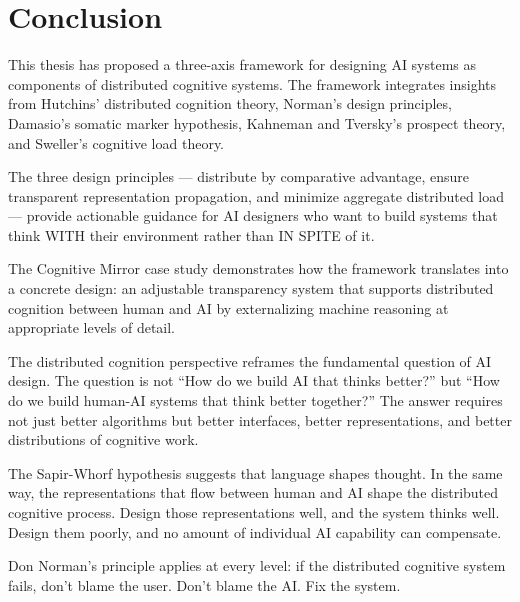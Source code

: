 \documentclass[11pt,a4paper]{article}
\begin{document}
\section{Conclusion}

This thesis has proposed a three-axis framework for designing AI systems as components of distributed cognitive systems. The framework integrates insights from Hutchins' distributed cognition theory, Norman's design principles, Damasio's somatic marker hypothesis, Kahneman and Tversky's prospect theory, and Sweller's cognitive load theory.

The three design principles --- distribute by comparative advantage, ensure transparent representation propagation, and minimize aggregate distributed load --- provide actionable guidance for AI designers who want to build systems that think WITH their environment rather than IN SPITE of it.

The Cognitive Mirror case study demonstrates how the framework translates into a concrete design: an adjustable transparency system that supports distributed cognition between human and AI by externalizing machine reasoning at appropriate levels of detail.

The distributed cognition perspective reframes the fundamental question of AI design. The question is not ``How do we build AI that thinks better?'' but ``How do we build human-AI systems that think better together?'' The answer requires not just better algorithms but better interfaces, better representations, and better distributions of cognitive work.

The Sapir-Whorf hypothesis suggests that language shapes thought. In the same way, the representations that flow between human and AI shape the distributed cognitive process. Design those representations well, and the system thinks well. Design them poorly, and no amount of individual AI capability can compensate.

Don Norman's principle applies at every level: if the distributed cognitive system fails, don't blame the user. Don't blame the AI. Fix the system.


\end{document}
